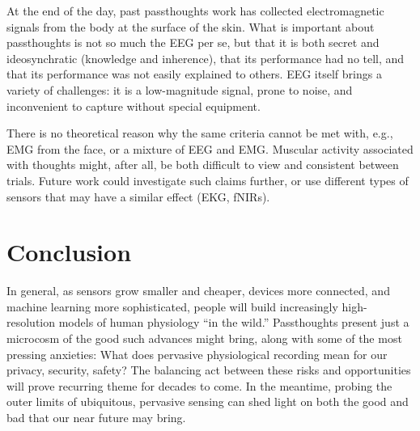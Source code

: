 \documentclass[sigconf]{acmart}
\begin{document}
At the end of the day, past passthoughts work has collected electromagnetic signals from the body at the surface of the skin.
What is important about passthoughts is not so much the EEG per se, but that it is both secret and ideosynchratic (knowledge and inherence), that its performance had no tell, and that its performance was not easily explained to others.
EEG itself brings a variety of challenges: it is a low-magnitude signal, prone to noise, and inconvenient to capture without special equipment.

There is no theoretical reason why the same criteria cannot be met with, e.g., EMG from the face, or a mixture of EEG and EMG.
Muscular activity associated with thoughts might, after all, be both difficult to view and consistent between trials.
Future work could investigate such claims further, or use different types of sensors that may have a similar effect (EKG, fNIRs).

\section{Conclusion}
\label{sec:org8594ecd}

In general, as sensors grow smaller and cheaper, devices more connected, and machine learning more sophisticated, 
people will build increasingly high-resolution models of human physiology ``in the wild.''
Passthoughts present just a microcosm of the good such advances might bring, 
along with some of the most pressing anxieties: 
What does pervasive physiological recording mean for our privacy, security, safety? 
The balancing act between these risks and opportunities will prove recurring theme for decades to come.
In the meantime, probing the outer limits of ubiquitous, pervasive sensing can shed light on both the good and bad that our near future may bring.



\end{document}
